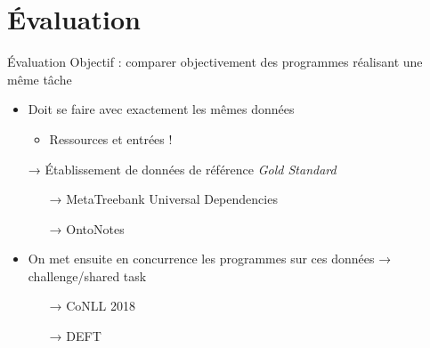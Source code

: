 \documentclass[xcolor={svgnames}, french]{beamer}
\title{\titlepagetitle}
\subtitle{\titlepagesubtitle}
\author{\textbf{\myname} (\mylab)}
\institute{}
\date{\tiny Version {\yyyymmdddate\today}T\currenttime}
\begin{document}

\begin{frame}[plain]
	\titlepage %
\end{frame}


\section{Évaluation}

\begin{frame}{Évaluation}
	Objectif : comparer \alert{objectivement} des programmes réalisant une même tâche
	\begin{itemize}
		\item Doit se faire avec exactement les mêmes données
			\begin{itemize}
				\item Ressources et entrées !
			\end{itemize}
		\item[→] Établissement de données de référence \alert{\textit{Gold Standard}}
			\begin{itemize}
				\item[→] MetaTreebank Universal Dependencies 
				\item[→] OntoNotes 
			\end{itemize}
		\item On met ensuite en concurrence les programmes sur ces données → challenge/shared task
			\begin{itemize}
				\item[→] CoNLL 2018 
				\item[→] \alert{DEFT} 
			\end{itemize}
	\end{itemize}
\end{frame}
\end{document}
